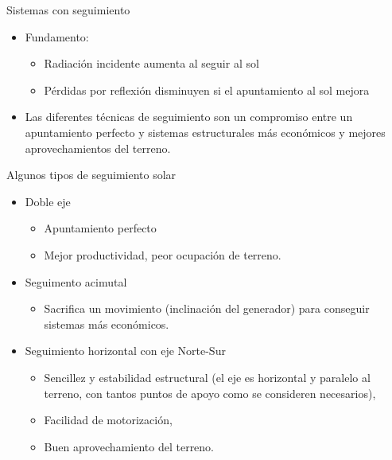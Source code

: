 \documentclass[xcolor={usenames,svgnames,dvipsnames}]{beamer}
\begin{document}
\begin{frame}[label={sec:org766d551}]{Sistemas con seguimiento}
\begin{itemize}[<+->]
\item \alert{Fundamento:}
\begin{itemize}[<.->]
\item Radiación incidente aumenta al seguir al sol

\item Pérdidas por reflexión disminuyen si el apuntamiento al sol mejora
\end{itemize}

\item Las diferentes técnicas de seguimiento son un compromiso entre un
apuntamiento perfecto y sistemas estructurales más económicos y
mejores aprovechamientos del terreno.
\end{itemize}
\end{frame}

\begin{frame}[label={sec:org8675233}]{Algunos tipos de seguimiento solar}
\begin{itemize}[<+->]
\item \alert{Doble eje}
\begin{itemize}[<.->]
\item Apuntamiento \guillemotleft{}perfecto\guillemotright{}

\item Mejor productividad, peor ocupación de terreno.
\end{itemize}

\item \alert{Seguimento acimutal}
\begin{itemize}[<.->]
\item Sacrifica un movimiento (inclinación del generador) para conseguir
sistemas más económicos.
\end{itemize}

\item \alert{Seguimiento horizontal con eje Norte-Sur}
\begin{itemize}[<.->]
\item Sencillez y estabilidad estructural (el eje es horizontal y
paralelo al terreno, con tantos puntos de apoyo como se consideren
necesarios),

\item Facilidad de motorización,

\item Buen aprovechamiento del terreno.
\end{itemize}
\end{itemize}
\end{frame}
\end{document}
